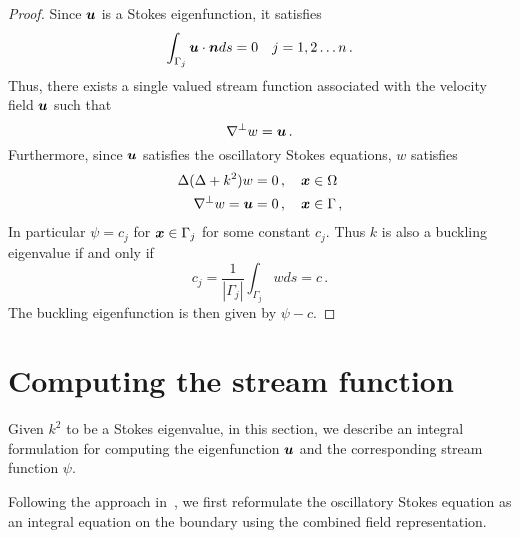 \begin{proof}
Since ${\boldsymbol u}$ is a Stokes eigenfunction, it satisfies
\begin{equation}
\int_{\Gamma_{j}} {\boldsymbol u} \cdot {\boldsymbol n} ds = 0 \quad j=1,2\ldots n \, .
\end{equation}
Thus, there exists a single valued stream function associated with the
velocity field ${\boldsymbol u}$ such that 
\begin{equation}
\nabla^{\perp} w = {\boldsymbol u} \, .
\end{equation}
Furthermore, since ${\boldsymbol u}$ satisfies the oscillatory Stokes equations, 
$w$ satisfies
\begin{align}
\Delta (\Delta + k^{2} ) w &= 0 \, , \quad {\boldsymbol x} \in \Omega \\
\nabla^{\perp} w = {\boldsymbol u} &=0 \, ,\quad {\boldsymbol x} \in \Gamma \, ,
\end{align}
In particular $\psi= c_{j}$ for ${\boldsymbol x} \in \Gamma_{j}$ for
some constant $c_{j}$.
Thus $k$ is also a buckling eigenvalue if and only if 
\begin{equation}
c_{j} = \frac{1}{|\Gamma_{j}|}\int_{\Gamma_{j}} w ds =  c \, .
\end{equation}
The buckling eigenfunction is then given by $\psi -c$. 
\end{proof}


\section{Computing the stream function}
Given $k^2$ to be a Stokes eigenvalue, in this section, we describe
an integral formulation for computing the eigenfunction ${\boldsymbol u}$
and the corresponding stream function $\psi$. 

Following the approach in~\cite{askhameig2019}, we
first reformulate the oscillatory Stokes equation
as an integral equation on the boundary using the combined
field representation.

